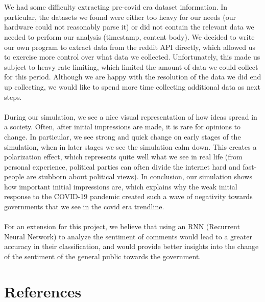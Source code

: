 \documentclass[fontsize=11pt]{article}
\begin{document}
\\\\
We had some difficulty extracting pre-covid era dataset information. In particular, the datasets we found were either too heavy for our needs (our hardware could not reasonably parse it) or did not contain the relevant data we needed to perform our analysis (timestamp, content body). We decided to write our own program to extract data from the reddit API directly, which allowed us to exercise more control over what data we collected. Unfortunately, this made us subject to heavy rate limiting, which limited the amount of data we could collect for this period. Although we are happy with the resolution of the data we did end up collecting, we would like to spend more time collecting additional data as next steps.
\\\\
During our simulation, we see a nice visual representation of how ideas spread in a society. Often, after initial impressions are made, it is rare for opinions to change. In particular, we see strong and quick change on early stages of the simulation, when in later stages we see the simulation calm down. This creates a polarization effect, which represents quite well what we see in real life (from personal experience, political parties can often divide the internet hard and fast- people are stubborn about political views). In conclusion, our simulation shows how important initial impressions are, which explains why the weak initial response to the COVID-19 pandemic created such a wave of negativity towards governments that we see in the covid era trendline.
\\\\
For an extension for this project, we believe that using an RNN (Recurrent Neural Network) to analyze the sentiment of comments would lead to a greater accuracy in their classification, and would provide better insights into the change of the sentiment of the general public towards the government. 


\section*{References}
\end{document}
